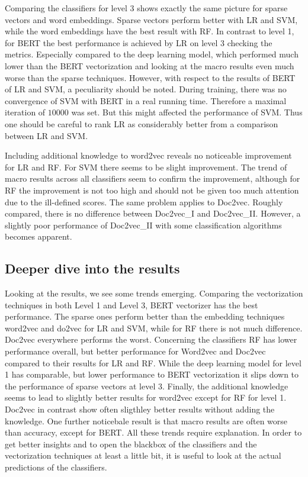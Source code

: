 \documentclass[12pt, a4paper, titlepage]{article}
\begin{document}
Comparing the classifiers for level 3 shows exactly the same picture for sparse vectors and word embeddings. Sparse vectors perform better with \ac{LR} and \ac{SVM}, while the word embeddings have the best result with \ac{RF}. In contrast to level 1, for \ac{BERT} the best performance is achieved by \ac{LR} on level 3 checking the metrics. Especially compared to the deep learning model, which performed much lower than the \ac{BERT} vectorization and looking at the macro results even much worse than the sparse techniques. However, with respect to the results of BERT of LR and SVM, a peculiarity should be noted. During training, there was no convergence of \ac{SVM} with \ac{BERT} in a real running time. Therefore a maximal iteration of $10000$ was set. But this might affected the performance of \ac{SVM}. Thus one should be careful to rank \ac{LR} as considerably better from a comparison between \ac{LR} and \ac{SVM}. 

Including additional knowledge to word2vec reveals no noticeable improvement for \ac{LR} and \ac{RF}. For \ac{SVM} there seems to be slight improvement. The trend of macro results across all classifiers seem to confirm the improvement, although for RF the improvement is not too high and should not be given too much attention due to the ill-defined scores. The same problem applies to Doc2vec. Roughly compared, there is no difference between Doc2vec\_I and Doc2vec\_II. However, a slightly poor performance of Doc2vec\_II with some classification algorithms becomes apparent. 


\subsection{Deeper dive into the results}
Looking at the results, we see some trends emerging. Comparing the vectorization techniques in both Level 1 and Level 3, \ac{BERT} vectorizer has the best performance. The sparse ones perform better than the embedding techniques word2vec and do2vec for LR and SVM, while for RF there is not much difference. Doc2vec everywhere performs the worst. Concerning the classifiers \ac{RF} has lower performance overall, but better performance for Word2vec and Doc2vec compared to their results for LR and RF. While the deep learning model for level 1 has comparable, but lower performance to BERT vectorization it slips down to the performance of sparse vectors at level 3. Finally, the additional knowledge seems to lead to slightly better results for word2vec except for \ac{RF} for level 1. Doc2vec in contrast show often sligthley better results without adding the knowledge. One further noticebale result is that macro results are often worse than accuracy, except for BERT. All these trends require explanation. In order to get better insights and to open the blackbox of the classifiers and the vectorization techniques at least a little bit, it is useful to look at the actual predictions of the classifiers.
\end{document}

